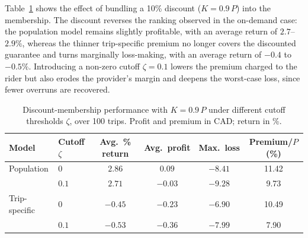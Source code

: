 \documentclass[12pt]{article}
\begin{document}
{{{{{{Table~\ref{tab:discount-metrics} shows the effect of bundling a 10\% discount
($K = 0.9\,P$) into the membership. The discount reverses the ranking observed in the
on-demand case: the population model remains slightly profitable, with an average
return of $2.7$--$2.9\%$, whereas the thinner trip-specific premium no longer covers
the discounted guarantee and turns marginally loss-making, with an average return of
$-0.4$ to $-0.5\%$. Introducing a non-zero cutoff $\zeta = 0.1$ lowers the premium
charged to the rider but also erodes the provider's margin and deepens the worst-case
loss, since fewer overruns are recovered.
\begin{table}[h!]
    \centering
    \caption{Discount-membership performance with $K = 0.9\,P$ under different cutoff
    thresholds $\zeta$, over 100 trips. Profit and premium in CAD; return in \%.}
    \begin{tabular}{l l c c c c}
    \hline
    Model & Cutoff $\zeta$ & Avg.\ \% return & Avg.\ profit & Max.\ loss & Premium/$P$ (\%) \\
    \hline
    Population    & $0$   & $2.86$  & $0.09$  & $-8.41$ & 11.42 \\
                  & $0.1$ & $2.71$  & $-0.03$ & $-9.28$ &  9.73 \\
    Trip-specific & $0$   & $-0.45$ & $-0.23$ & $-6.90$ & 10.49 \\
                  & $0.1$ & $-0.53$ & $-0.36$ & $-7.99$ &  7.90 \\
    \hline
    \end{tabular}
    \label{tab:discount-metrics}
\end{table}
}}}}}}
\end{document}
